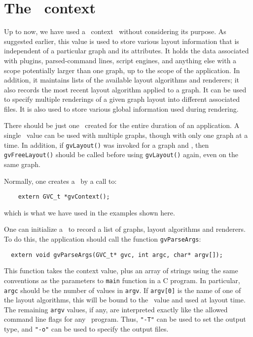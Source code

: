 \section{The \gviz\ context}
\label{sec:gvc}

Up to now, we have used a \gviz\ context \gvc\ without
considering its purpose. As suggested earlier, this value is used
to store various layout information that is independent of a particular
graph and its attributes. 
It holds the data associated with plugins, parsed-command lines, 
script engines, and anything else with a scope potentially larger 
than one graph, up to the scope of the application.
In addition, it maintains lists of the
available layout algorithms and renderers; it also records the most recent
layout algorithm applied to a graph. It can be used to specify multiple
renderings of a given graph layout into different associated files.
It is also used to store various global information used during
rendering.

There should be just one \gvc\ created for the entire 
duration of an application.
A single \gvc\ value can be used with multiple graphs, though
with only one graph at a time. In addition, if {\tt gvLayout()}
was invoked for a graph and \gvc, then {\tt gvFreeLayout()} should
be called before using {\tt gvLayout()} again, even on the same graph.
 
Normally, one creates a \gvc\ by a call to:
\begin{verbatim}
    extern GVC_t *gvContext();
\end{verbatim}
which is what we have used in the examples shown here.

One can initialize a \gvc\ to record a list of graphs, layout algorithms
and renderers. To do this, the application should
call the function {\tt gvParseArgs}:
\begin{verbatim}
  extern void gvParseArgs(GVC_t* gvc, int argc, char* argv[]);
\end{verbatim}
This function takes the context value, plus an array of strings
using the same conventions as the parameters to {\tt main} function
in a C program. In particular, {\tt argc} should be the number of
values in {\tt argv}. If {\tt argv[0]} is the name of one of the
layout algorithms, this will be bound to the \gvc\ value and used
at layout time.
The remaining {\tt argv} values, if any, are interpreted exactly like
the allowed command line flags for any \gviz\ program.
Thus, {\tt "-T"} can be used to set the output type, and {\tt "-o"}
can be used to specify the output files.

